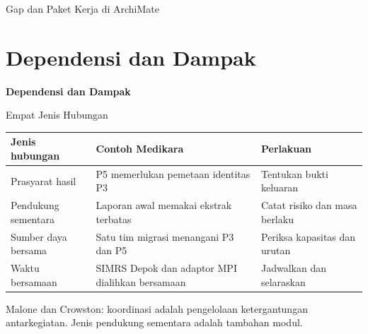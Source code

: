 \documentclass[aspectratio=169, table, 12pt]{beamer}
\begin{document}
\begin{frame}{{\Large Gap dan Paket Kerja di ArchiMate}}
  \centering
  \begin{figure}
  \end{figure}
\end{frame}

\section{Dependensi dan Dampak}

\begin{frame}{\hfill}
  \centering
  \Huge{\textbf{Dependensi dan Dampak}}
\end{frame}

\begin{frame}{{\Large Empat Jenis Hubungan}}
  \footnotesize
  \begin{tabularx}{\textwidth}{>{\raggedright\arraybackslash}p{3.3cm}>{\raggedright\arraybackslash}X>{\raggedright\arraybackslash}X}
    \hline
    \textbf{Jenis hubungan} & \textbf{Contoh Medikara} & \textbf{Perlakuan} \\ \hline
    Prasyarat hasil & P5 memerlukan pemetaan identitas P3 & Tentukan bukti keluaran \\ \hline
    Pendukung sementara & Laporan awal memakai ekstrak terbatas & Catat risiko dan masa berlaku \\ \hline
    Sumber daya bersama & Satu tim migrasi menangani P3 dan P5 & Periksa kapasitas dan urutan \\ \hline
    Waktu bersamaan & SIMRS Depok dan adaptor MPI dialihkan bersamaan & Jadwalkan dan selaraskan \\ \hline
  \end{tabularx}

  \vspace{8pt}
  \small Malone dan Crowston: koordinasi adalah pengelolaan ketergantungan antarkegiatan. Jenis pendukung sementara adalah
  tambahan modul.
\end{frame}
\end{document}
